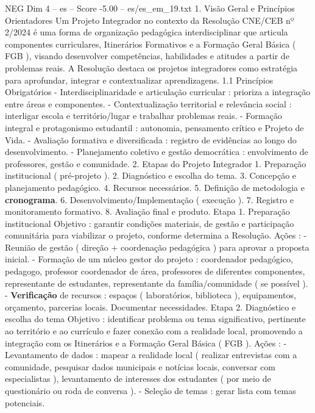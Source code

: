 \begin{textsample}{NEG Dim 4 – es – Score -5.00 – es/es\_em\_19.txt}  \label{ex:f4_neg_211}
1.
Visão Geral e Princípios Orientadores Um Projeto Integrador no contexto da Resolução CNE/CEB nº 2/2024 é uma forma de organização pedagógica interdisciplinar que articula componentes curriculares, Itinerários Formativos e a Formação Geral Básica ( FGB ), visando desenvolver competências, habilidades e atitudes a partir de problemas reais.
A Resolução destaca os projetos integradores como estratégia para aprofundar, integrar e contextualizar aprendizagens. 1.1 Princípios Obrigatórios - Interdisciplinaridade e articulação curricular : prioriza a integração entre áreas e componentes. - Contextualização territorial e relevância social : interligar escola e território/lugar e trabalhar problemas reais. - Formação integral e protagonismo estudantil : autonomia, pensamento crítico e Projeto de Vida. - Avaliação formativa e diversificada : registro de evidências ao longo do desenvolvimento. - Planejamento coletivo e gestão democrática : envolvimento de professores, gestão e comunidade. 2.
Etapas do Projeto Integrador 1.
Preparação institucional ( pré-projeto ). 2.
Diagnóstico e escolha do tema. 3.
Concepção e planejamento pedagógico. 4.
Recursos necessários. 5.
Definição de metodologia e \textbf{cronograma}. 6.
Desenvolvimento/Implementação ( execução ). 7.
Registro e monitoramento formativo. 8.
Avaliação final e produto.
Etapa 1.
Preparação institucional Objetivo : garantir condições materiais, de gestão e participação comunitária para viabilizar o projeto, conforme determina a Resolução.
Ações : - Reunião de gestão ( direção + coordenação pedagógica ) para aprovar a proposta inicial. - Formação de um núcleo gestor do projeto : coordenador pedagógico, pedagogo, professor coordenador de área, professores de diferentes componentes, representante de estudantes, representante da família/comunidade ( se possível ). - \textbf{Verificação} de recursos : espaços ( laboratórios, biblioteca ), equipamentos, orçamento, parcerias locais.
Documentar necessidades.
Etapa 2.
Diagnóstico e escolha do tema Objetivo : identificar problema ou tema significativo, pertinente ao território e ao currículo e fazer conexão com a realidade local, promovendo a integração com os Itinerários e a Formação Geral Básica ( FGB ).
Ações : - Levantamento de dados : mapear a realidade local ( realizar entrevistas com a comunidade, pesquisar dados municipais e notícias locais, conversar com especialistas ), levantamento de interesses dos estudantes ( por meio de questionário ou roda de conversa ). - Seleção de temas : gerar lista com temas potenciais.

\end{textsample}
